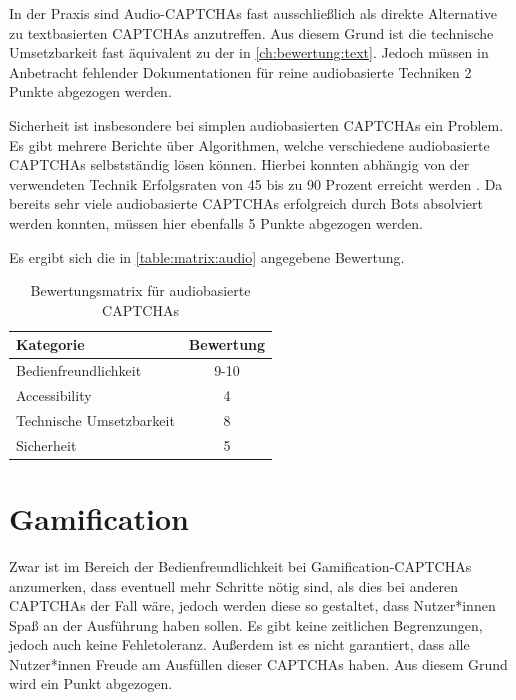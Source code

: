 In der Praxis sind Audio-CAPTCHAs fast ausschließlich als direkte Alternative zu textbasierten CAPTCHAs anzutreffen.
Aus diesem Grund ist die technische Umsetzbarkeit fast äquivalent zu der in \autoref{ch:bewertung:text}.
Jedoch müssen in Anbetracht fehlender Dokumentationen für reine audiobasierte Techniken 2 Punkte abgezogen werden.

Sicherheit ist insbesondere bei simplen audiobasierten CAPTCHAs ein Problem.
Es gibt mehrere Berichte über Algorithmen, welche verschiedene audiobasierte CAPTCHAs selbstständig lösen können.
Hierbei konnten abhängig von der verwendeten Technik Erfolgsraten von 45 bis zu 90 Prozent erreicht werden \cite[p.78f]{surveyofresearch}.
Da bereits sehr viele audiobasierte CAPTCHAs erfolgreich durch Bots absolviert werden konnten,
müssen hier ebenfalls 5 Punkte abgezogen werden.

Es ergibt sich die in \autoref{table:matrix:audio} angegebene Bewertung.

\begin{table}[h!]
    \caption{Bewertungsmatrix für audiobasierte CAPTCHAs}
    \begin{center}
        \begin{tabular}{l|c}
            Kategorie                       & Bewertung \\\hline
            Bedienfreundlichkeit            & 9-10         \\
            Accessibility                   & 4        \\
            Technische Umsetzbarkeit        & 8         \\
            Sicherheit                      & 5         
        \end{tabular}
    \end{center}
    \label{table:matrix:audio}
\end{table}

\pagebreak

\section{Gamification}
Zwar ist im Bereich der Bedienfreundlichkeit bei Gamification-CAPTCHAs anzumerken, 
dass eventuell mehr Schritte nötig sind, als dies bei anderen CAPTCHAs der Fall wäre,
jedoch werden diese so gestaltet, dass Nutzer*innen Spaß an der Ausführung haben sollen. 
Es gibt keine zeitlichen Begrenzungen, jedoch auch keine Fehletoleranz.
Außerdem ist es nicht garantiert, dass alle Nutzer*innen Freude am Ausfüllen dieser CAPTCHAs haben.
Aus diesem Grund wird ein Punkt abgezogen.

